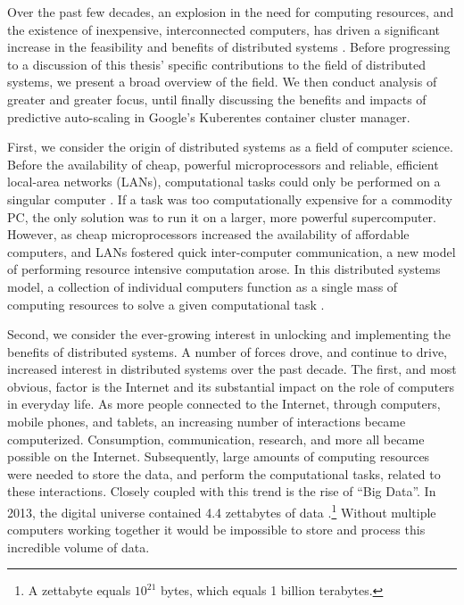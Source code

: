 Over the past few decades, an explosion in the need for computing resources,
and the existence of inexpensive, interconnected computers, has
driven a significant increase in the feasibility and benefits of distributed
systems \cite{distributed-systems-principles-and-paradigms}. Before progressing
to a discussion of this thesis' specific contributions to the field of distributed
systems, we present a broad overview of the field. We then conduct analysis of
greater and greater focus, until finally discussing the benefits and impacts of
predictive auto-scaling in Google's Kuberentes container cluster manager.

First, we consider the origin of distributed systems as a field of computer
science. Before the availability of cheap, powerful microprocessors and reliable,
efficient local-area networks (LANs), computational tasks could only be
performed on a singular computer
\cite{distributed-systems-principles-and-paradigms}. If a task was too
computationally expensive for a commodity PC, the only solution was to run
it on a larger, more powerful supercomputer. However, as cheap microprocessors
increased the availability of affordable computers, and LANs fostered quick inter-computer
communication, a new
model of performing resource intensive computation arose.
In this distributed systems model, a collection of individual
computers function as a single mass of computing resources
to solve a given computational task
\cite{distributed-systems-principles-and-paradigms}.

Second, we consider the ever-growing interest in unlocking and implementing the
benefits of distributed systems. A number of forces drove, and continue to drive,
increased interest in distributed systems over
the past decade. The first, and most obvious, factor is the Internet and its
substantial impact on the role of computers in everyday life.
As more people connected to the Internet, through computers,
mobile phones, and tablets, an increasing number of interactions became
computerized. Consumption, communication, research, and more all
became possible on the Internet. Subsequently, large amounts of computing resources
were needed to store the data, and perform the computational tasks, related to these
interactions. Closely coupled with this trend is the rise of ``Big Data''.
In 2013, the digital universe contained 4.4 zettabytes of data
\cite{the-digital-universe-of-opportunities}.\footnote{A
  zettabyte equals $10^{21}$ bytes, which equals 1 billion
terabytes.} Without
multiple computers working together it would be impossible to store and process
this incredible volume of data.

